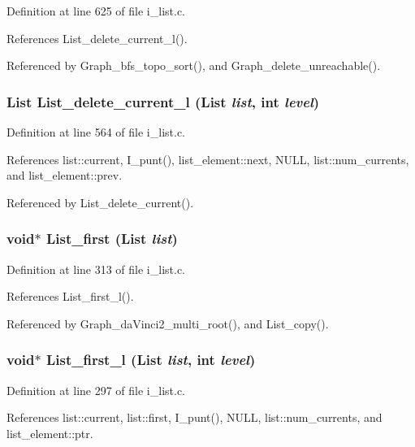 Definition at line 625 of file i\_\-list.c.

References List\_\-delete\_\-current\_\-l().

Referenced by Graph\_\-bfs\_\-topo\_\-sort(), and Graph\_\-delete\_\-unreachable().
\subsubsection{\setlength{\rightskip}{0pt plus 5cm}\bf{List} List\_\-delete\_\-current\_\-l (\bf{List} {\em list}, int {\em level})}\label{i__list_8c_a4c4cb63b882db1dbef81de56b65f194}




Definition at line 564 of file i\_\-list.c.

References list::current, I\_\-punt(), list\_\-element::next, NULL, list::num\_\-currents, and list\_\-element::prev.

Referenced by List\_\-delete\_\-current().
\subsubsection{\setlength{\rightskip}{0pt plus 5cm}void$\ast$ List\_\-first (\bf{List} {\em list})}\label{i__list_8c_501f7638b6a227713fff0f893dd80db8}




Definition at line 313 of file i\_\-list.c.

References List\_\-first\_\-l().

Referenced by Graph\_\-da\-Vinci2\_\-multi\_\-root(), and List\_\-copy().
\subsubsection{\setlength{\rightskip}{0pt plus 5cm}void$\ast$ List\_\-first\_\-l (\bf{List} {\em list}, int {\em level})}\label{i__list_8c_e3e99885f49e231390381734b36e7883}




Definition at line 297 of file i\_\-list.c.

References list::current, list::first, I\_\-punt(), NULL, list::num\_\-currents, and list\_\-element::ptr.

